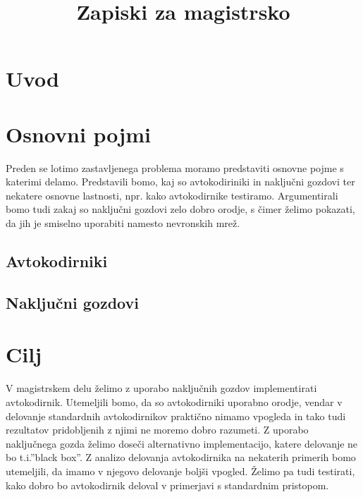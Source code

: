 \documentclass[12pt,a4paper]{article}
\begin{document}
\title{\LARGE{Zapiski za magistrsko}}
\maketitle


\section{Uvod}

\section{Osnovni pojmi}
Preden se lotimo zastavljenega problema moramo predstaviti osnovne pojme s katerimi delamo. Predstavili bomo, kaj so avtokodiriniki in naključni gozdovi ter nekatere osnovne lastnosti, npr. kako avtokodirnike testiramo. Argumentirali bomo tudi zakaj so naključni gozdovi zelo dobro orodje, s čimer želimo pokazati, da jih je smiselno uporabiti namesto nevronskih mrež.

\subsection{Avtokodirniki}

\subsection{Naključni gozdovi}

\section{Cilj}  
V magistrskem delu želimo z uporabo naključnih gozdov implementirati avtokodirnik. Utemeljili bomo, da so avtokodirniki uporabno orodje, vendar v delovanje standardnih avtokodirnikov praktično nimamo vpogleda in tako tudi rezultatov pridobljenih z njimi ne moremo dobro razumeti. Z uporabo naključnega gozda želimo doseči alternativno implementacijo, katere delovanje ne bo t.i.''black box''. Z analizo delovanja avtokodirnika na nekaterih primerih bomo utemeljili, da imamo v njegovo delovanje boljši vpogled. Želimo pa tudi testirati, kako dobro bo avtokodirnik deloval v primerjavi s standardnim pristopom.
\end{document}
